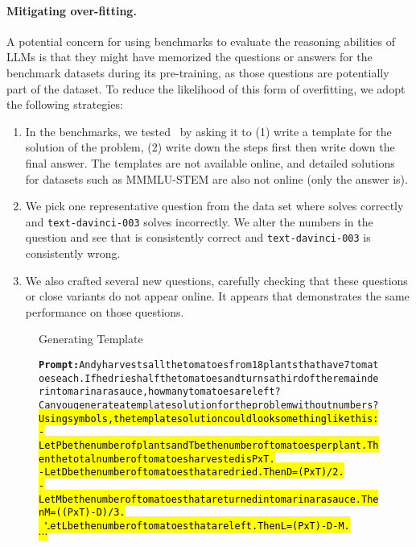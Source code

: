 \paragraph{Mitigating over-fitting.} A potential concern for using benchmarks to evaluate the reasoning abilities of LLMs is that they might have memorized the questions or answers for the benchmark datasets during its pre-training, as those questions are potentially part of the dataset. To reduce the likelihood of this form of overfitting, we adopt the following strategies:
\begin{enumerate}
    \item In the benchmarks, we tested \DV \ by asking it to (1) write a template for the solution of the problem, (2) write down the steps first then write down the final answer. The templates are not available online, and detailed solutions for datasets such as MMMLU-STEM are also not online (only the answer is). %
    \item We pick one representative question from the data set where {\DV} solves correctly and \texttt{text-davinci-003} solves incorrectly. We alter the numbers in the question and see that {\DV} is consistently correct and \texttt{text-davinci-003} is consistently wrong. 
    \item We also crafted several new questions, carefully checking that these questions or close variants do not appear online. It appears that {\DV} demonstrates the same performance on those questions. 
\end{enumerate}
\begin{figure}[H]
\begin{AIbox}{{\DV} Generating Template}\vspace{-5px}
\parbox{1\textwidth}{\scriptsize\begin{alltt} 
{\bf Prompt:} Andy harvests all the tomatoes from 18 plants that have 7 tomatoes each. If he dries half the tomatoes and turns a third of the remainder into marinara sauce, how many tomatoes are left?\\
Can you generate a template solution for the problem without numbers?\\

\hl{Using symbols, the template solution could look something like this:\\
- Let P be the number of plants and T be the number of tomatoes per plant. Then the total number of tomatoes harvested is P x T.\\
- Let D be the number of tomatoes that are dried. Then D = (P x T) / 2.\\
- Let M be the number of tomatoes that are turned into marinara sauce. Then M = ((P x T) - D) / 3.\\
- Let L be the number of tomatoes that are left. Then L = (P x T) - D - M.\\
$\cdots$}\end{alltt}}\vspace{-5px}
\end{AIbox}
\end{figure}


